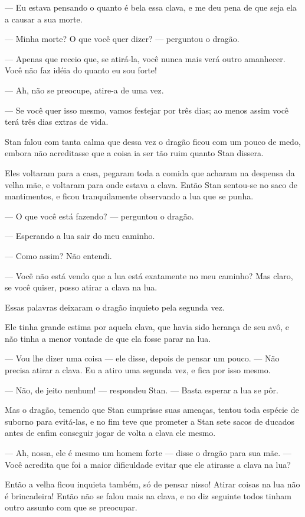 — Eu estava pensando o quanto é bela essa clava, e me deu pena de que
seja ela a causar a sua morte.

— Minha morte? O que você quer dizer? — perguntou o dragão.

— Apenas que receio que, se atirá-la, você nunca mais verá outro
amanhecer. Você não faz idéia do quanto eu sou forte!

— Ah, não se preocupe, atire-a de uma vez.

— Se você quer isso mesmo, vamos festejar por três dias; ao menos
assim você terá três dias extras de vida.

Stan falou com tanta calma que dessa vez o dragão ficou com um pouco
de medo, embora não acreditasse que a coisa ia ser tão ruim quanto
Stan dissera.

Eles voltaram para a casa, pegaram toda a comida que acharam na
despensa da velha mãe, e voltaram para onde estava a clava. Então
Stan sentou-se no saco de mantimentos, e ficou tranquilamente
observando a lua que se punha.

— O que você está fazendo? — perguntou o dragão.

— Esperando a lua sair do meu caminho.

— Como assim? Não entendi.

— Você não está vendo que a lua está exatamente no meu caminho? Mas
claro, se você quiser, posso atirar a clava na lua.

Essas palavras deixaram o dragão inquieto pela segunda vez.

Ele tinha grande estima por aquela clava, que havia sido herança de
seu avô, e não tinha a menor vontade de que ela fosse parar na lua.

— Vou lhe dizer uma coisa — ele disse, depois de pensar um pouco. —
Não precisa atirar a clava. Eu a atiro uma segunda vez, e fica por
isso mesmo.

— Não, de jeito nenhum! — respondeu Stan. — Basta esperar a lua se
pôr.

Mas o dragão, temendo que Stan cumprisse suas ameaças, tentou toda
espécie de suborno para evitá-las, e no fim teve que prometer a Stan
sete sacos de ducados antes de enfim conseguir jogar de volta a clava
ele mesmo.

— Ah, nossa, ele é mesmo um homem forte — disse o dragão para sua mãe.
— Você acredita que foi a maior dificuldade evitar que ele atirasse a
clava na lua? 

Então a velha ficou inquieta também, só de pensar nisso! Atirar coisas
na lua não é brincadeira! Então não se falou mais na clava, e no diz
seguinte todos tinham outro assunto com que se preocupar.

